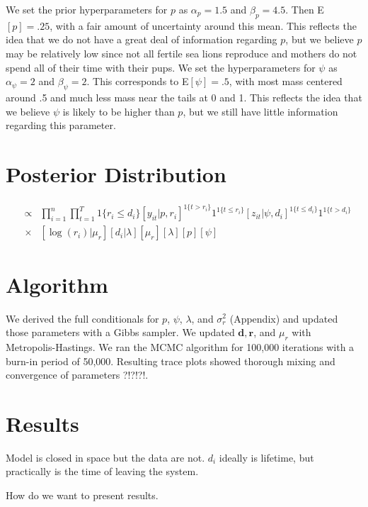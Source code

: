 \documentclass[12pt, a4paper]{article}
\begin{document}
We set the prior hyperparameters for $p$ as $\alpha_p = 1.5$ and $\beta_p = 4.5$. Then E$[p] = .25$, with a fair amount of uncertainty around this mean. This reflects the idea that we do not have a great deal of information regarding $p$, but we believe $p$ may be relatively low since not all fertile sea lions reproduce and mothers do not spend all of their time with their pups. We set the hyperparameters for $\psi$ as $\alpha_{\psi} = 2$ and $\beta_{\psi} = 2$. This corresponds to E$[\psi] = .5$, with most mass centered around .5 and much less mass near the tails at 0 and 1. This reflects the idea that we believe $\psi$ is likely to be higher than $p$, but we still have little information regarding this parameter.  

\section{Posterior Distribution}

\begin{eqnarray*}
[\log (\mathbf{r}), \mu_r, p, \mathbf{d}, \lambda, \psi | \mathbf{z}, \mathbf{y} ] & \propto & \prod_{i=1}^n \prod_{t=1} ^T  1\{r_i \leq d_i \} [y_{it}|p,r_i]^{1\{ t > r_i \}} 1^{1\{ t \leq r_i \}} [z_{it}|\psi, d_i]^{1 \{ t \leq d_i\} } 1^{1 \{ t > d_i\}} \\
  & \times & [\log(r_i)|\mu_r][d_i|\lambda]  [\mu_r][\lambda][p][\psi]
\end{eqnarray*}


\section{Algorithm}

We derived the full conditionals for $p$, $\psi$, $\lambda$, and $\sigma_r^2$ (Appendix) and updated those parameters with a Gibbs sampler. We updated $\mathbf{d}, \mathbf{r}$, and $\mu_r$ with Metropolis-Hastings. We ran the MCMC algorithm for 100,000 iterations with a burn-in period of 50,000. Resulting trace plots showed thorough mixing and convergence of parameters ?!?!?!. 

\section{Results}

Model is closed in space but the data are not. $d_i$ ideally is lifetime, but practically is the time of leaving the system. 

How do we want to present results. 
\end{document}
